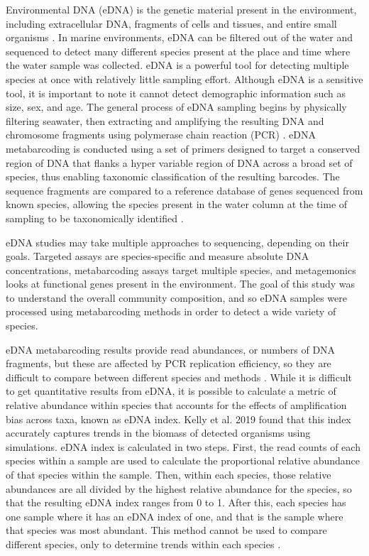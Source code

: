 \documentclass[12pt,twoside]{reedthesis}
\begin{document}
Environmental DNA (eDNA) is the genetic material present in the environment, including extracellular DNA, fragments of cells and tissues, and entire small organisms \autocite{Taberlet2018}. In marine environments, eDNA can be filtered out of the water and sequenced to detect many different species present at the place and time where the water sample was collected. eDNA is a powerful tool for detecting multiple species at once with relatively little sampling effort. Although eDNA is a sensitive tool, it is important to note it cannot detect demographic information such as size, sex, and age. The general process of eDNA sampling begins by physically filtering seawater, then extracting and amplifying the resulting DNA and chromosome fragments using polymerase chain reaction (PCR) \autocite{Power2023}. eDNA metabarcoding is conducted using a set of  primers designed to target a conserved region of DNA that flanks a hyper variable region of DNA across a broad set of species, thus enabling taxonomic classification of the resulting barcodes. The sequence fragments are compared to a reference database of genes sequenced from known species, allowing the species present in the water column at the time of sampling to be taxonomically identified \autocite{Miya2022}.

eDNA studies may take multiple approaches to sequencing, depending on their goals. Targeted assays are species-specific and measure absolute DNA concentrations, metabarcoding assays target multiple species, and metagemonics looks at functional genes present in the environment. The goal of this study was to understand the overall community composition, and so eDNA samples were processed using metabarcoding methods in order to detect a wide variety of species.

eDNA metabarcoding results provide read abundances, or numbers of DNA fragments, but these are affected by PCR replication efficiency, so they are difficult to compare between different species and methods \autocite{Miya2022}. While it is difficult to get quantitative results from eDNA, it is possible to calculate a metric of relative abundance within species that accounts for the effects of amplification bias across taxa, known as eDNA index. Kelly et al. 2019 found that this index accurately captures trends in the biomass of detected organisms using simulations. eDNA index is calculated in two steps. First, the read counts of each species within a sample are used to calculate the proportional relative abundance of that species within the sample. Then, within each species, those relative abundances are all divided by the highest relative abundance for the species, so that the resulting eDNA index ranges from 0 to 1. After this, each species has one sample where it has an eDNA index of one, and that is the sample where that species was most abundant. This method cannot be used to compare different species, only to determine trends within each species \autocite{Kelly2019}.
\end{document}
